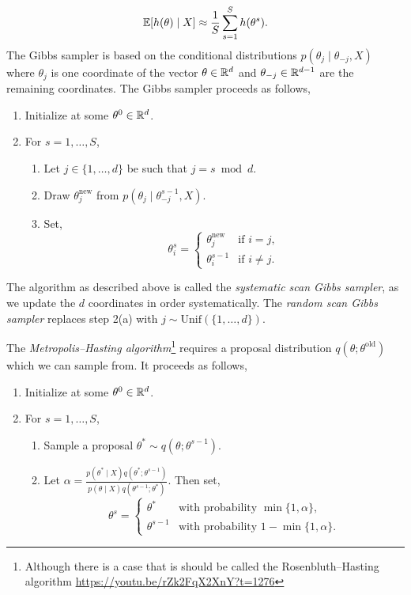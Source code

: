 \begin{equation}\label{eq:MCMC-est} {\mathbb E}[h(\theta)\mid X] \approx \frac{1}{S}\sum_{s=1}^S h(\theta^s).\end{equation}
The Gibbs sampler is based on the conditional distributions $p(\theta_j \mid \theta_{-j},X)$ where $\theta_j$ is one coordinate of the vector $\theta \in \mathbb{R}^d$ and $\theta_{-j} \in \mathbb{R}^{d-1}$ are the remaining coordinates. The Gibbs sampler proceeds as follows,

\begin{enumerate}
    \item Initialize at some $\theta^0 \in \mathbb{R}^d$.
    \item For $s=1,\ldots,S$,
    \begin{enumerate}
        \item Let $j \in \{1,\ldots,d\}$ be such that $j=s \bmod d$.
        \item Draw $\theta_j^{\mathrm{new}}$ from $p(\theta_j \mid \theta_{-j}^{s-1},X)$. 
        \item Set,
        \[ \theta_i^s = \begin{cases}
            \theta_j^{\mathrm{new}} & \text{if } i = j,\\
            \theta_i^{s-1} & \text{if } i \neq j. \end{cases}\]
    \end{enumerate}
\end{enumerate}
The algorithm as described above is called the \emph{systematic scan Gibbs sampler},
as we update  the $d$ coordinates in order systematically. The \emph{random scan Gibbs
sampler} replaces step 2(a) with $j \sim \mathrm{Unif}(\{1,\ldots,d\})$. 

The \emph{Metropolis--Hasting algorithm}\footnote{Although there is a case that is should be called the Rosenbluth--Hasting algorithm \url{https://youtu.be/rZk2FqX2XnY?t=1276}} requires a proposal distribution $q(\theta;\theta^{\mathrm{old}})$ which we can sample from. It proceeds as follows,
\begin{enumerate}
    \item Initialize at some $\theta^0 \in \mathbb{R}^d$.
    \item For $s=1,\ldots,S$,
    \begin{enumerate}
        \item Sample a proposal $\theta^* \sim q(\theta;\theta^{s-1})$.
        \item Let $\alpha = \frac{p(\theta^*\mid X)q(\theta^*;\theta^{s-1})}{p(\theta\mid X)q(\theta^{s-1};\theta^*)}$. Then set,
        \[\theta^s = \begin{cases}
            \theta^* &\text{with probability } \min\{1,\alpha\},\\
            \theta^{s-1}&\text{with probability } 1-\min\{1,\alpha\}.
        \end{cases} \]
    \end{enumerate}
\end{enumerate}


